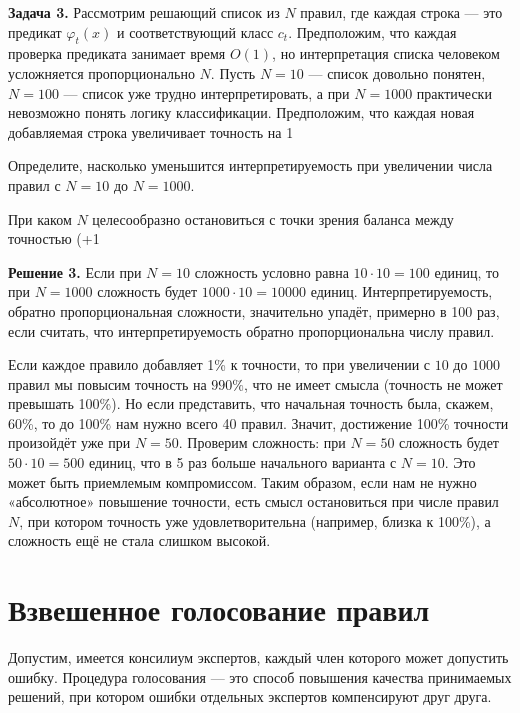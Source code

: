 \medskip

\textbf{Задача 3.} Рассмотрим решающий список из $N$ правил, где каждая строка — это предикат $\varphi_t(x)$ и соответствующий класс $c_t$. Предположим, что каждая проверка предиката занимает время $O(1)$, но интерпретация списка человеком усложняется пропорционально $N$. Пусть $N = 10$ — список довольно понятен, $N = 100$ — список уже трудно интерпретировать, а при $N = 1000$ практически невозможно понять логику классификации. Предположим, что каждая новая добавляемая строка увеличивает точность на 1%

Определите, насколько уменьшится интерпретируемость при увеличении числа правил с $N = 10$ до $N = 1000$.

При каком $N$ целесообразно остановиться с точки зрения баланса между точностью (+1%

\textbf{Решение 3.}
Если при $N=10$ сложность условно равна $10 \cdot 10 = 100$ единиц, то при $N=1000$ сложность будет $1000 \cdot 10 = 10000$ единиц. Интерпретируемость, обратно пропорциональная сложности, значительно упадёт, примерно в 100 раз, если считать, что интерпретируемость обратно пропорциональна числу правил.

Если каждое правило добавляет 1\% к точности, то при увеличении с $10$ до $1000$ правил мы повысим точность на $990\%$, что не имеет смысла (точность не может превышать 100\%). Но если представить, что начальная точность была, скажем, 60\%, то до 100\% нам нужно всего 40 правил. Значит, достижение 100\% точности произойдёт уже при $N=50$. Проверим сложность: при $N=50$ сложность будет $50 \cdot 10 = 500$ единиц, что в 5 раз больше начального варианта с $N=10$. Это может быть приемлемым компромиссом. Таким образом, если нам не нужно «абсолютное» повышение точности, есть смысл остановиться при числе правил $N$, при котором точность уже удовлетворительна (например, близка к 100\%), а сложность ещё не стала слишком высокой.






\section{Взвешенное голосование правил}

Допустим, имеется консилиум экспертов, каждый член которого может допустить ошибку. Процедура голосования — это способ повышения качества принимаемых решений, при котором ошибки отдельных экспертов компенсируют друг друга.

